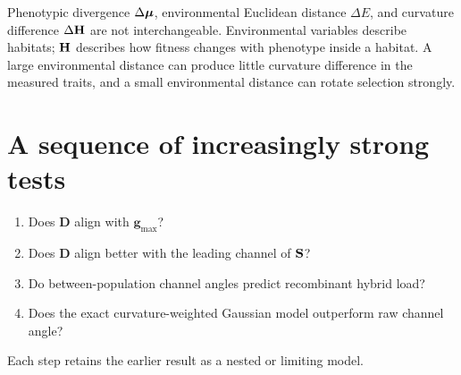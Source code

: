 \begin{cautionbox}
Phenotypic divergence \(\Delta\boldsymbol{\mu}\), environmental Euclidean distance \(\Delta E\), and curvature difference \(\Delta\mathbf{H}\) are not interchangeable. Environmental variables describe habitats; \(\mathbf{H}\) describes how fitness changes with phenotype inside a habitat. A large environmental distance can produce little curvature difference in the measured traits, and a small environmental distance can rotate selection strongly.
\end{cautionbox}

\section{A sequence of increasingly strong tests}

\begin{enumerate}[leftmargin=1.6em]
\item Does \(\mathbf D\) align with \(\mathbf g_{\max}\)?
\item Does \(\mathbf D\) align better with the leading channel of \(\mathbf{S}\)?
\item Do between-population channel angles predict recombinant hybrid load?
\item Does the exact curvature-weighted Gaussian model outperform raw channel angle?
\end{enumerate}

Each step retains the earlier result as a nested or limiting model.
